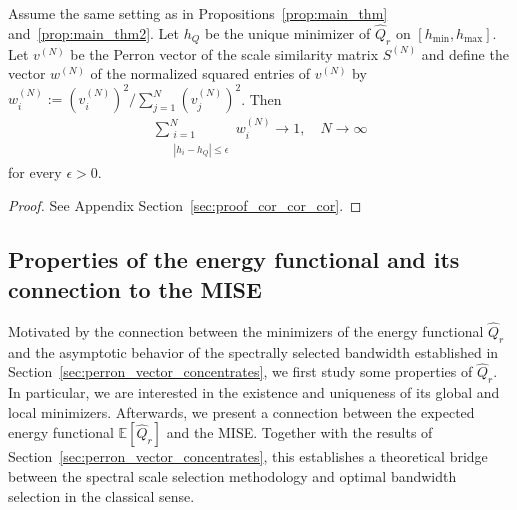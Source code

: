 \begin{Cor}\label{cor:cor_cor_cor}
    Assume the same setting as in Propositions~\ref{prop:main_thm} and~\ref{prop:main_thm2}. Let $h_Q$ be the unique minimizer of $\hat{Q}_r$ on $[h_{\min},h_{\max}]$. Let $v^{(N)}$ be the Perron vector of the scale similarity matrix $S^{(N)}$ and define the vector $w^{(N)}$ of the normalized squared entries of $v^{(N)}$ by $w_i^{(N)}:=(v_i^{(N)})^2/\sum_{j=1}^{N}(v_j^{(N)})^2$. Then
    \begin{align}\label{eq:squared_mass_concentration}
        \sum_{\substack{i=1\\|h_i-h_Q|\le\epsilon}}^{N}w_i^{(N)}\to1,\quad N\to\infty
    \end{align}
    for every $\epsilon>0$.
\end{Cor}

\begin{proof}
    See Appendix Section~\ref{sec:proof_cor_cor_cor}.
\end{proof}


\subsection{Properties of the energy functional and its connection to the MISE}\label{sec:expected_energy_functional}

Motivated by the connection between the minimizers of the energy functional $\hat{Q}_r$ and the asymptotic behavior of the spectrally selected bandwidth established in Section~\ref{sec:perron_vector_concentrates}, we first study some properties of $\hat{Q}_r$. In particular, we are interested in the existence and uniqueness of its global and local minimizers. Afterwards, we present a connection between the expected energy functional $\mathbb{E}[\hat{Q}_r]$ and the MISE. Together with the results of Section~\ref{sec:perron_vector_concentrates}, this establishes a theoretical bridge between the spectral scale selection methodology and optimal bandwidth selection in the classical sense.

